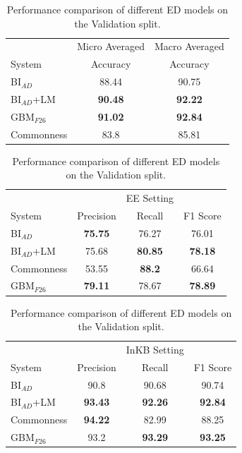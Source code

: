 \documentclass{report}
\theoremstyle{definition}
\theoremstyle{remark}
\begin{document}
\begin{table}
    \centering
    \begin{tabular}{lcc}
    &Micro Averaged & Macro Averaged\\
    System     & Accuracy &Accuracy \\
    \hline
    BI$_{AD}$   & 88.44&90.75\\
    BI$_{AD}$+LM& \textbf{90.48} &\textbf{92.22}\\
    GBM$_{F26}$ & \textbf{91.02}&\textbf{92.84}\\
    Commonness  &83.8&85.81 \\
    \end{tabular}
    
    \vspace{0.5cm}\begin{tabular}{lccc}
    &&EE Setting & \\
    System    & Precision & Recall & F1 Score \\
    \hline
    BI$_{AD}$  &  \textbf{75.75}& 76.27&	76.01\\
    BI$_{AD}$+LM & 75.68& \textbf{80.85}& \textbf{78.18}\\
    Commonness  & 53.55& \textbf{88.2}&	66.64 \\
    GBM$_{F26}$  & \textbf{79.11}& 78.67&	\textbf{78.89} \\
    \end{tabular}
    
    \vspace{0.5cm}\begin{tabular}{lccc}
    &&InKB Setting & \\
    System    & Precision & Recall & F1 Score \\
    \hline
    BI$_{AD}$   & 90.8&90.68&	90.74\\
    BI$_{AD}$+LM  & \textbf{93.43}& \textbf{92.26}& \textbf{92.84}\\
    Commonness  & \textbf{94.22}&82.99	&88.25 \\
     GBM$_{F26}$   & 93.2&\textbf{93.29}&	\textbf{93.25}\\
    \end{tabular}
       
    \caption{Performance comparison of different ED models on the Validation split.}
    \label{tab:edresultsval}
\end{table}
\end{document}
